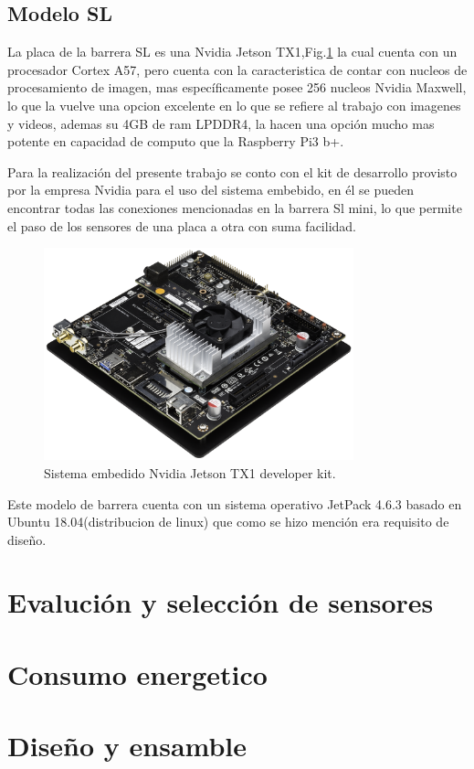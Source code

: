 \subsection{Modelo SL}
La placa de la barrera SL es una Nvidia Jetson TX1,Fig.\ref{fig:JTX1} la cual cuenta con un procesador Cortex A57, pero 
cuenta con la caracteristica de contar con nucleos de procesamiento de imagen, mas específicamente posee 256 nucleos Nvidia Maxwell, 
lo que la vuelve una opcion excelente en lo que se refiere al trabajo con imagenes y videos, ademas su 4GB de ram LPDDR4, 
la hacen una opción mucho mas potente en capacidad de computo que la Raspberry Pi3 b+.

Para la realización del presente trabajo se conto con el kit de desarrollo provisto por la empresa Nvidia para el uso 
del sistema embebido, en él se pueden encontrar todas las conexiones mencionadas en la barrera Sl mini, lo que permite 
el paso de los sensores de una placa a otra con suma facilidad.
\begin{figure}
    \centering
    \includegraphics[width=0.8\textwidth]{imgs/JTX1-developerkit.png}
    \caption{Sistema embedido Nvidia Jetson TX1 developer kit.}
    \label{fig:JTX1}
\end{figure}
Este modelo de barrera cuenta con un sistema operativo JetPack 4.6.3 basado en Ubuntu 18.04(distribucion de linux) que 
como se hizo mención era requisito de diseño.

\section{Evalución y selección de sensores}

\section{Consumo energetico}

\section{Diseño y ensamble}